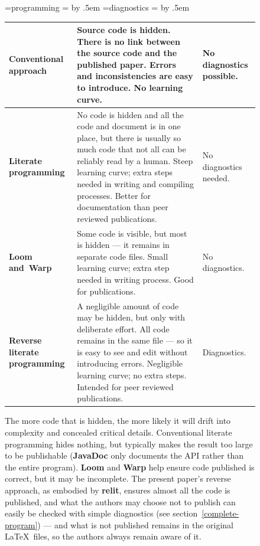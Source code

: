 \documentclass[12pt]{article}
\def\name#1{\textbf{#1}}
\def\mycaption#1{\sf\bfseries\caption{\sf #1}}
\begin{document}
\begin{figure}
\begin{center}\sf
\newdimen\cola {}=\hbox{programming} \cola= \advance\cola by .5em
\newdimen\colc {}=\hbox{diagnostics} \colc= \advance\colc by .5em
\def\gap{\vskip .5ex\hrule\vskip .5ex}
\noindent\begin{tabular}{|p{\cola}|p{3.4in}|p{\colc}|}  \hline
\bfseries Conventional approach& 
Source code is hidden. There is no link between the source code and the published paper. Errors and inconsistencies are easy to introduce. No learning curve.&
No \hbox{diagnostics} possible. \\ \hline

\bfseries Literate \hbox{programming}& 
No code is hidden and all the code and document is in one place, but there is usually so much code that not all can be reliably read by a human.  Steep learning curve; extra steps needed in writing and compiling processes. Better for documentation than peer reviewed publications.&
No \hbox{diagnostics} needed. \gap \hbox{Fewer files} to maintain.\\ \hline

\bfseries \hbox{Loom} \hbox{and Warp}& 
Some code is visible, but most is hidden --- it remains in separate code files. Small learning curve; extra step needed in writing process. Good for publications.&
No \hbox{diagnostics}. \\ \hline

\bfseries Reverse literate \hbox{programming}& 
A negligible amount of code may be hidden, but only with deliberate effort. All code remains in the same file --- so it is easy to see and edit without introducing errors. Negligible learning curve; no extra steps. Intended for peer reviewed publications. &Diagnostics. \gap \hbox{Fewer files} to maintain. \\ \hline
\end{tabular}
\end{center}
\mycaption{The more code that is hidden, the more likely it will drift into complexity and concealed critical details. Conventional literate programming hides nothing, but typically makes the result too large to be publishable (\name{JavaDoc} only documents the API rather than the entire program). \name{Loom} and \name{Warp} help ensure code published is correct, but it may be incomplete. The present paper's reverse approach, as embodied by \name{relit}, ensures almost all the code is published, and what the authors may choose not to publish can easily be checked with simple diagnostics (see section~\ref{complete-program}) --- and what is not published remains in the original \LaTeX\ files, so the authors always remain aware of it.}
\label{fig:lp2}
\end{figure}
\end{document}
